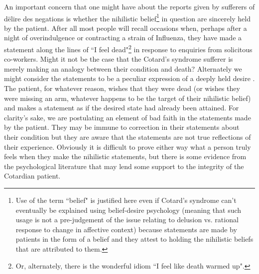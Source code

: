 An important concern that one might have about the reports given by sufferers of d\"{e}lire des negations is whether the nihilistic belief\footnote{Use of the term ``belief" is justified here even if Cotard's syndrome can't eventually be explained using belief-desire psychology (meaning that such usage is not a pre-judgement of the issue relating to delusion vs. rational response to change in affective context) because statements are made by patients in the form of a belief and they attest to holding the nihilistic beliefs that are attributed to them.} in question are sincerely held by the patient. After all most people will recall occasions when, perhaps after a night of overindulgence or contracting a strain of Influenza, they have made a statement along the lines of ``I feel dead"\footnote{Or, alternately, there is the wonderful idiom ``I feel like death warmed up".} in response to enquiries from solicitous co-workers. Might it not be the case that the Cotard's syndrome sufferer is merely making an analogy between their condition and death? Alternately we might consider the statements to be a peculiar expression of a deeply held desire \cite{turnbull2004}. The patient, for whatever reason, wishes that they were dead (or wishes they were missing an arm, whatever happens to be the target of their nihilistic belief) and makes a statement as if the desired state had already been attained. For clarity's sake, we are postulating an element of bad faith in the statements made by the patient. They may be immune to correction in their statements about their condition but they are aware that the statements are not true reflections of their experience. Obviously it is difficult to prove either way what a person truly feels when they make the nihilistic statements, but there is some evidence from the psychological literature that may lend some support to the integrity of the Cotardian patient.

